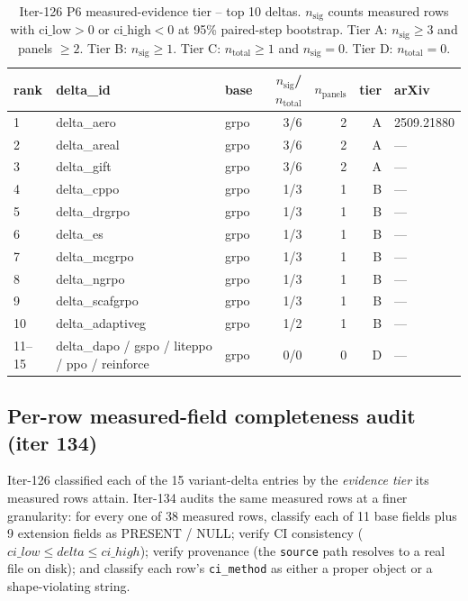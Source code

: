 \documentclass{article}
\begin{document}
\begin{table}[t]
\centering
\small
\caption{Iter-126 P6 measured-evidence tier -- top 10 deltas.  $n_{\text{sig}}$ counts
measured rows with $\text{ci\_low} > 0$ or $\text{ci\_high} < 0$ at 95\% paired-step bootstrap.
Tier A: $n_{\text{sig}} \geq 3$ and panels $\geq 2$.  Tier B: $n_{\text{sig}} \geq 1$.
Tier C: $n_{\text{total}} \geq 1$ and $n_{\text{sig}} = 0$.  Tier D: $n_{\text{total}} = 0$.}
\label{tab:p6-iter126-tier-rk}
\begin{tabular}{lllrrrl}
\toprule
rank & delta\_id & base & $n_{\text{sig}}$/$n_{\text{total}}$ & $n_{\text{panels}}$ & tier & arXiv \\
\midrule
1 & delta\_aero     & grpo & 3/6 & 2 & A & 2509.21880 \\
2 & delta\_areal    & grpo & 3/6 & 2 & A & --- \\
3 & delta\_gift     & grpo & 3/6 & 2 & A & --- \\
4 & delta\_cppo     & grpo & 1/3 & 1 & B & --- \\
5 & delta\_drgrpo   & grpo & 1/3 & 1 & B & --- \\
6 & delta\_es       & grpo & 1/3 & 1 & B & --- \\
7 & delta\_mcgrpo   & grpo & 1/3 & 1 & B & --- \\
8 & delta\_ngrpo    & grpo & 1/3 & 1 & B & --- \\
9 & delta\_scafgrpo & grpo & 1/3 & 1 & B & --- \\
10 & delta\_adaptiveg & grpo & 1/2 & 1 & B & --- \\
\midrule
11--15 & delta\_dapo / gspo / liteppo / ppo / reinforce & grpo & 0/0 & 0 & D & --- \\
\bottomrule
\end{tabular}
\end{table}
 

\subsection{Per-row measured-field completeness audit (iter 134)}
\label{sec:p6-iter134-field-completeness}

Iter-126 classified each of the 15 variant-delta entries by the \emph{evidence
tier} its measured rows attain. Iter-134 audits the same measured rows at a
finer granularity: for every one of 38 measured rows, classify each of 11
base fields plus 9 extension fields as PRESENT / NULL; verify CI consistency
($\mathit{ci\_low} \leq \mathit{delta} \leq \mathit{ci\_high}$); verify
provenance (the \texttt{source} path resolves to a real file on disk); and
classify each row's \texttt{ci\_method} as either a proper object or a
shape-violating string.
\end{document}
